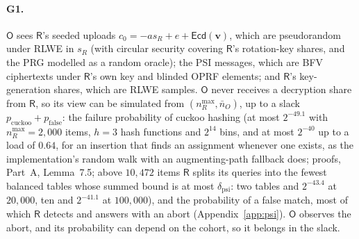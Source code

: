 \documentclass[11pt]{article}
\theoremstyle{definition}
\theoremstyle{plain}
\newcommand{\Ecd}{\mathsf{Ecd}}
\newcommand{\Party}[1]{\textsf{#1}}
\newcommand{\Rp}{\Party{R}}
\newcommand{\Op}{\Party{O}}
\begin{document}
\paragraph{G1.} $\Op$ sees $\Rp$'s seeded uploads $c_0 = -a s_R + e + \Ecd(\mathbf v)$, which are pseudorandom under RLWE in $s_R$ (with circular security covering $\Rp$'s rotation-key shares, and the PRG modelled as a random oracle); the PSI messages, which are BFV ciphertexts under $\Rp$'s own key and blinded OPRF elements; and $\Rp$'s key-generation shares, which are RLWE samples. $\Op$ never receives a decryption share from $\Rp$, so its view can be simulated from $(n_R^{\max}, \bar n_O)$, up to a slack $p_{\mathrm{cuckoo}} + p_{\mathrm{false}}$: the failure probability of cuckoo hashing (at most $2^{-49.1}$ with $n_R^{\max} = 2{,}000$ items, $h = 3$ hash functions and $2^{14}$ bins, and at most $2^{-40}$ up to a load of $0.64$, for an insertion that finds an assignment whenever one exists, as the implementation's random walk with an augmenting-path fallback does; proofs, Part~A, Lemma~7.5; above $10{,}472$ items $\Rp$ splits its queries into the fewest balanced tables whose summed bound is at most $\delta_{\mathrm{psi}}$: two tables and $2^{-43.4}$ at $20{,}000$, ten and $2^{-41.1}$ at $100{,}000$), and the probability of a false match, most of which $\Rp$ detects and answers with an abort (Appendix~\ref{app:psi}). $\Op$ observes the abort, and its probability can depend on the cohort, so it belongs in the slack.
\end{document}
